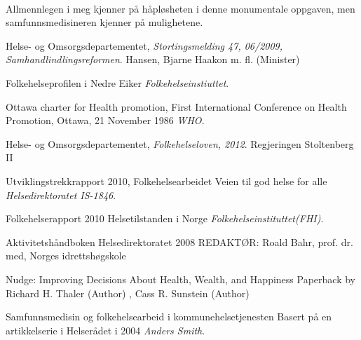 \documentclass[11pt]{memoir} %
\begin{document}
		\paragraph{}
			Allmennlegen i meg kjenner på håpløsheten i denne monumentale oppgaven, men samfunnsmedisineren kjenner på mulighetene. 

 \renewcommand{\bibname}{Kilder:}
              \begin{thebibliography}{99}

                  Helse- og Omsorgsdepartementet,
                  \emph{Stortingsmelding 47, 06/2009, Samhandlindlingsreformen}.
                  Hansen, Bjarne Haakon m. fl. (Minister)

                  Folkehelseprofilen i Nedre Eiker
                  \emph{Folkehelseinstiuttet}.
                  
                  Ottawa charter for Health promotion,
                  First International Conference on Health Promotion, Ottawa, 21 November 1986
                  \emph{WHO}.

                  Helse- og Omsorgsdepartementet,
                  \emph{Folkehelseloven, 2012}.
                  Regjeringen Stoltenberg II


                  Utviklingstrekkrapport 2010, Folkehelsearbeidet
                  Veien til god helse for alle
                  \emph{Helsedirektoratet IS-1846}.

                  Folkehelserapport 2010
                  Helsetilstanden i Norge
                  \emph{Folkehelseinstituttet(FHI)}.

                  Aktivitetshåndboken
                  Helsedirektoratet 2008
                  REDAKTØR: Roald Bahr, prof. dr. med, Norges idrettshøgskole
                 
                 	Nudge: Improving Decisions About Health, Wealth, and Happiness Paperback
					by Richard H. Thaler (Author) , Cass R. Sunstein  (Author)
                 
                  Samfunnsmedisin og folkehelsearbeid i kommunehelsetjenesten
                  Basert på en artikkelserie i Helserådet i 2004
                  \emph{Anders Smith}.

\end{thebibliography}
\end{document}
